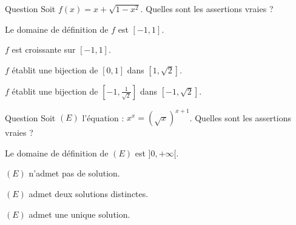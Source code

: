 \begin{multi}{Question}
Soit \(f(x)=x+ \sqrt{ 1-x^2}\).  Quelles sont les assertions vraies ?

    \item* Le domaine de définition de \(f\) est \([-1,1]\).
    \item \(f\) est croissante sur \([-1,1]\).
    \item \(f\) établit une bijection de \([0,1]\) dans \([1,\sqrt 2]\).
    \item* \(f\) établit une bijection de \([-1,\frac{1}{\sqrt 2}]\) dans \([-1,\sqrt 2]\).
\end{multi}


\begin{multi}[multiple,feedback=
{\((E)\) est définie si \(x>0\). 
Soit \(x>0\), alors \((E) \Leftrightarrow x \ln x  = \frac{1}{2}(x+1)\ln x  \Leftrightarrow (x-1) \ln x = 0 \Leftrightarrow x=1.\)
}]{Question}
Soit \((E)\) l'équation : \( x^x=(\sqrt x)^{x+1}\).  Quelles sont les assertions vraies ?

    \item* Le domaine de définition de \((E)\) est \(]0,+\infty[\).
    \item \((E)\) n'admet pas de solution.
    \item \((E)\) admet deux solutions distinctes.
    \item* \((E)\) admet une unique solution.
\end{multi}


